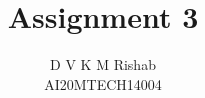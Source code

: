 \documentclass[journal,12pt,twocolumn]{IEEEtran}
\begin{document}
\makeatletter
{}
\makeatother
\let\StandardTheFigure\thefigure
\let\vec\mathbf
\renewcommand{\thefigure}{\theproblem}
\def\putbox#1#2#3{\makebox[0in][l]{\makebox[#1][l]{}\raisebox{\baselineskip}[0in][0in]{\raisebox{#2}[0in][0in]{#3}}}}
     \def\rightbox#1{\makebox[0in][r]{#1}}
     \def\centbox#1{\makebox[0in]{#1}}
     \def\topbox#1{\raisebox{-\baselineskip}[0in][0in]{#1}}
     \def\midbox#1{\raisebox{-0.5\baselineskip}[0in][0in]{#1}}
\vspace{3cm}
\title{Assignment 3}
\author{D V K M Rishab \\ AI20MTECH14004}
%
%
%
% 
%
\end{document}
